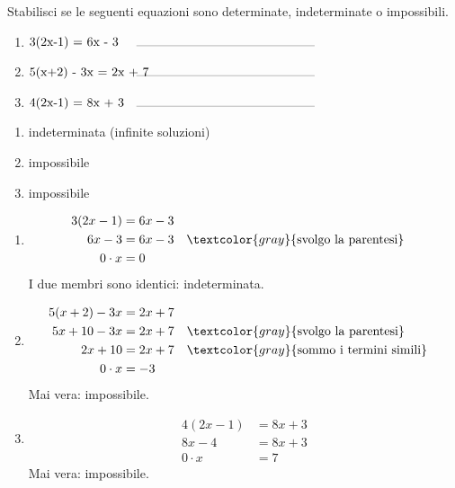 
\begin{question}[ID=1.4, subtitle={Classificazione di equazioni con parentesi}, difficulty=media, tags={equazioni}]
Stabilisci se le seguenti equazioni sono determinate, indeterminate o impossibili.
\begin{enumerate}[leftmargin=3cm]
    \item $\makebox[3cm][l]{3(2x-1) = 6x - 3}\rule{5cm}{0.2pt}$
    \item $\makebox[3cm][l]{5(x+2) - 3x = 2x + 7}\rule{5cm}{0.2pt}$
    \item $\makebox[3cm][l]{4(2x-1) = 8x + 3}\rule{5cm}{0.2pt}$
\end{enumerate}
\begin{solution}
\begin{enumerate}
    \item indeterminata (infinite soluzioni)
    \item impossibile
    \item impossibile
\end{enumerate}
\end{solution}
\begin{explanation}
\begin{enumerate}
    \item \[\begin{aligned}
    3(2x-1) &= 6x-3\\
    6x-3 &= 6x-3 && \textcolor{gray}{\text{svolgo la parentesi}}\\
    0\cdot x &= 0
    \end{aligned}\]
    I due membri sono identici: indeterminata.
    \item \[\begin{aligned}
    5(x+2)-3x &= 2x+7\\
    5x+10-3x &= 2x+7 && \textcolor{gray}{\text{svolgo la parentesi}}\\
    2x+10 &= 2x+7 && \textcolor{gray}{\text{sommo i termini simili}}\\
    0\cdot x &= -3
    \end{aligned}\]
    Mai vera: impossibile.
    \item \[\begin{aligned}
    4(2x-1) &= 8x+3\\
    8x-4 &= 8x+3\\
    0\cdot x &= 7
    \end{aligned}\]
    Mai vera: impossibile.
\end{enumerate}
\end{explanation}
\end{question}

